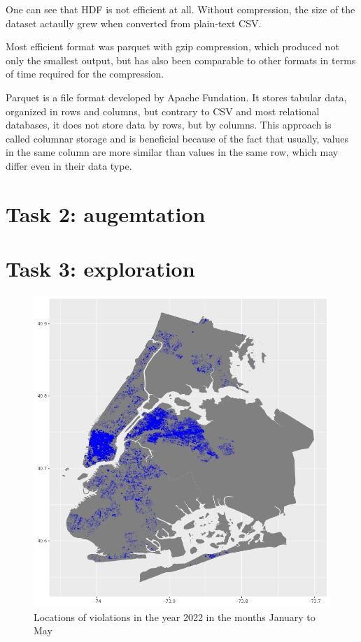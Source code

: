 \documentclass[12pt]{fphw}
\begin{document}
One can see that HDF is not efficient at all. Without compression, the size of the dataset actaully grew when converted from plain-text CSV. 

Most efficient format was parquet with gzip compression, which produced not only the smallest output, but has also been comparable to other formats in terms of time required for the compression.

Parquet is a file format developed by Apache Fundation. It stores tabular data, organized in rows and columns, but contrary to CSV and most relational databases, it does not store data by rows, but by columns. This approach is called columnar storage and is beneficial because of the fact that usually, values in the same column are more similar than values in the same row, which may differ even in their data type. 

\section{Task 2: augemtation}

\section{Task 3: exploration}

\begin{figure}[h!]
  \includegraphics[width=1\textwidth]{figures/nyc.map.png}
  \caption{Locations of violations in the year 2022 in the months January to May}
\end{figure}
\end{document}
